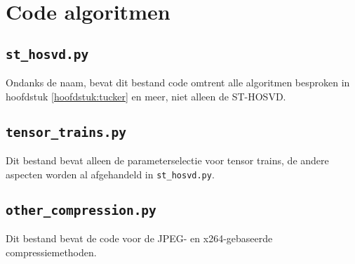 \chapter{Code algoritmen}
\label{app:algoritmen}

\section{\texttt{st\_hosvd.py}}

Ondanks de naam, bevat dit bestand code omtrent alle algoritmen besproken in hoofdstuk \ref{hoofdstuk:tucker} en meer, niet alleen de ST-HOSVD.\\



\section{\texttt{tensor\_trains.py}}

Dit bestand bevat alleen de parameterselectie voor tensor trains, de andere aspecten worden al afgehandeld in \texttt{st\_hosvd.py}.\\



\section{\texttt{other\_compression.py}}

Dit bestand bevat de code voor de JPEG- en x264-gebaseerde compressiemethoden.\\

